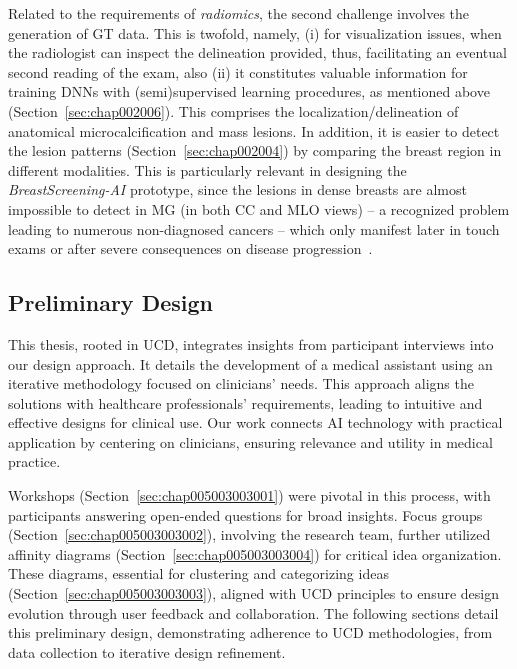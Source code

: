 Related to the requirements of {\it radiomics}, the second challenge involves the generation of \ac{GT} data.
This is twofold, namely,
(i) for visualization issues, when the radiologist can inspect the delineation provided, thus, facilitating an eventual second reading of the exam, also
(ii) it constitutes valuable information for training \acp{DNN} with (semi)supervised learning procedures, as mentioned above (Section~\ref{sec:chap002006}).
This comprises the localization/delineation of anatomical microcalcification and mass lesions.
In addition, it is easier to detect the lesion patterns (Section~\ref{sec:chap002004}) by comparing the breast region in different modalities.
This is particularly relevant in designing the {\it BreastScreening-AI} prototype, since the lesions in dense breasts are almost impossible to detect in \ac{MG} (in both \ac{CC} and \ac{MLO} views) -- a recognized problem leading to numerous non-diagnosed cancers -- which only manifest later in touch exams or after severe consequences on disease progression~\cite{mohamed2018deep}.

\subsection{Preliminary Design}
\label{sec:chap005003003}

\textcolor{revised}{This thesis, rooted in \ac{UCD}, integrates insights from participant interviews into our design approach.
It details the development of a medical assistant using an iterative methodology focused on clinicians' needs.
This approach aligns the solutions with healthcare professionals' requirements, leading to intuitive and effective designs for clinical use.
Our work connects \ac{AI} technology with practical application by centering on clinicians, ensuring relevance and utility in medical practice.}

\textcolor{revised}{Workshops (Section~\ref{sec:chap005003003001}) were pivotal in this process, with participants answering open-ended questions for broad insights.
Focus groups (Section~\ref{sec:chap005003003002}), involving the research team, further utilized affinity diagrams (Section~\ref{sec:chap005003003004}) for critical idea organization.
These diagrams, essential for clustering and categorizing ideas (Section~\ref{sec:chap005003003003}), aligned with \ac{UCD} principles to ensure design evolution through user feedback and collaboration.
The following sections detail this preliminary design, demonstrating adherence to \ac{UCD} methodologies, from data collection to iterative design refinement.}

